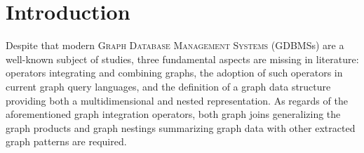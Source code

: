 \chapter{Introduction}

Despite that modern \textsc{Graph Database Management Systems} (GDBMSs) are a well-known subject of studies, three fundamental aspects are missing in literature: operators integrating and combining graphs, the adoption of such operators in current graph query languages, and the definition of a graph data structure providing both a multidimensional and nested representation. As regards of the aforementioned graph integration operators, both graph joins generalizing the graph products and graph nestings summarizing graph data with other extracted graph patterns are required. 






